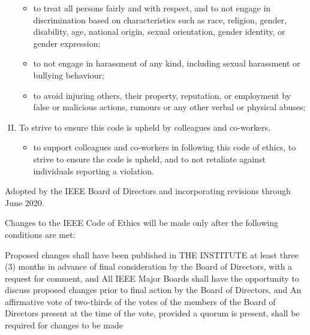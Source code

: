 \begin{enumerate}[I.]
\begin{itemize}
        \item to treat all persons fairly and with respect, and to not engage in discrimination based on characteristics such as race, religion, gender, disability, age, national origin, sexual orientation, gender identity, or gender expression;

        \item to not engage in harassment of any kind, including sexual harassment or bullying behaviour;

        \item to avoid injuring others, their property, reputation, or employment by false or malicious actions, rumours or any other verbal or physical abuses;
    \end{itemize}
    \item To strive to ensure this code is upheld by colleagues and co-workers.
    \begin{itemize}
        \item to support colleagues and co-workers in following this code of ethics, to strive to ensure the code is upheld, and to not retaliate against individuals reporting a violation.
    \end{itemize}

\end{enumerate}

Adopted by the IEEE Board of Directors and incorporating revisions through June 2020.

Changes to the IEEE Code of Ethics will be made only after the following conditions are met:

Proposed changes shall have been published in THE INSTITUTE at least three (3) months in advance of final consideration by the Board of Directors, with a request for comment, and
All IEEE Major Boards shall have the opportunity to discuss proposed changes prior to final action by the Board of Directors, and
An affirmative vote of two-thirds of the votes of the members of the Board of Directors present at the time of the vote, provided a quorum is present, shall be required for changes to be made






